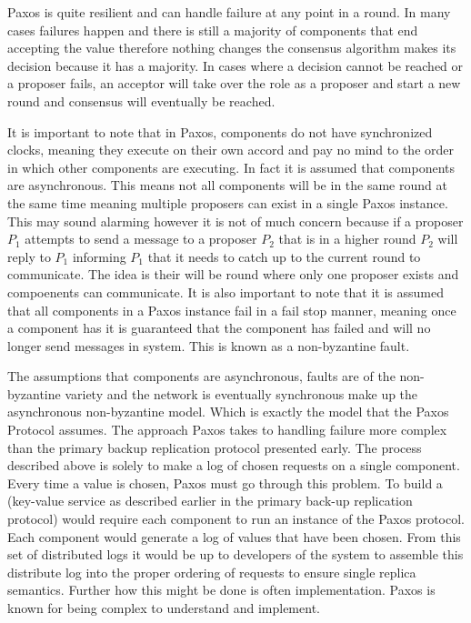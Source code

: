 \documentclass[conference]{IEEEtran}
\begin{document}
Paxos is quite resilient and can handle failure at any point in a round. In many cases failures happen and there is still a majority of components that end accepting the value therefore nothing changes the consensus algorithm makes its decision because it has a majority. In cases where a decision cannot be reached or a proposer fails, an acceptor will take over the role as a proposer and start a new round and consensus will eventually be reached. 

It is important to note that in Paxos, components do not have synchronized clocks, meaning they execute on their own accord and pay no mind to the order in which other components are executing. In fact it is assumed that components are asynchronous. This means not all components will be in the same round at the same time meaning multiple proposers can exist in a single Paxos instance. This may sound alarming however it is not of much concern because if a proposer \(P_1\) attempts to send a message to a proposer \(P_2\) that is in a higher round \(P_2\) will reply to \(P_1\) informing \(P_1\) that it needs to catch up to the current round to communicate. The idea is their will be round where only one proposer exists and compoenents can communicate. It is also important to note that it is assumed that all components in a Paxos instance fail in a fail stop manner, meaning once a component has it is guaranteed that the component has failed and will no longer send messages in system. This is known as a non-byzantine fault. 

The assumptions that components are asynchronous, faults are of the non-byzantine variety and the network is eventually synchronous make up the asynchronous non-byzantine model. Which is exactly the model that the Paxos Protocol assumes. The approach Paxos takes to handling failure more complex than the primary backup replication protocol presented early. The process described above is solely to make a log of chosen requests on a single component. Every time a value is chosen, Paxos must go through this problem. To build a (key-value service as described earlier in the primary back-up replication protocol) would require each component to run an instance of the Paxos protocol. Each component would generate a log of values that have been chosen. From this set of distributed logs it would be up to developers of the system to assemble this distribute log into the proper ordering of requests to ensure single replica semantics. Further how this might be done is often implementation. Paxos is known for being complex to understand and implement.
\end{document}
